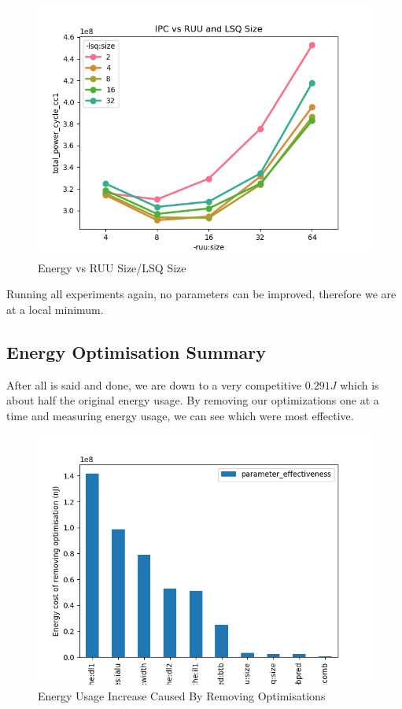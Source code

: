 \documentclass{article}
\newcommand{\optimisation}[1]{
  
}
\begin{document}
\begin{multicols}{2}
  \begin{figure}[H]
    \centering
    \includegraphics[width=\linewidth]{./assets/energy_vs_ruu_and_lsq_size2.png}
    \caption{Energy vs RUU Size/LSQ Size}
    \label{fig:energy_vs_ruu_lsq2}
  \end{figure}

  \optimisation{ruu_lsq_iter}

  Running all experiments again, no parameters can be improved, therefore we are at a local minimum.

  \subsection{Energy Optimisation Summary}
  After all is said and done, we are down to a very competitive $0.291J$ which is about half the original energy usage. By removing our optimizations one at a time and measuring energy usage, we can see which were most effective.

  \begin{figure}[H]
    \centering
    \includegraphics[width=\linewidth]{./assets/parameter_effectiveness.png}
    \caption{Energy Usage Increase Caused By Removing Optimisations}
    \label{fig:parameter_effectiveness}
  \end{figure}


\end{multicols}
\end{document}

